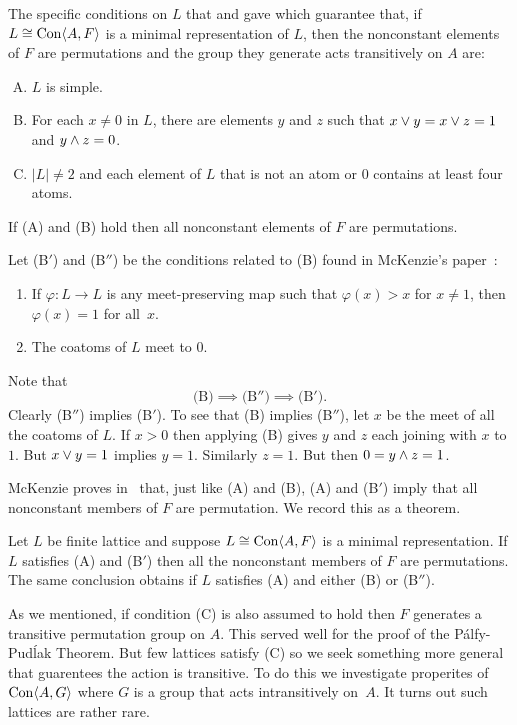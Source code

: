 The specific conditions on $L$ that 
\Palfy and \Pudlak gave which guarantee 
that, if $L \cong \operatorname{Con} \langle A,F\rangle$ is a minimal representation of $L$,
then the nonconstant elements of $F$ are 
permutations and the group they generate acts transitively on $A$ are:
\begin{enumerate}[(A)]
\item $L$ is simple.
\item For each $x \ne 0$ in $L$, there are elements $y$ and $z$
such that $x \vee y = x \vee z = 1$ and $y\wedge z = 0$.
\item $|L|\ne 2$ and each element of $L$ that is not an atom or $0$ contains at
least four atoms.
\end{enumerate}
If (A) and (B) hold then all nonconstant elements of $F$ are permutations.

Let (B$'$) and (B$''$) be the conditions related to (B) found in McKenzie's
paper~\cite{McKenzie1983}:
\begin{enumerate}
\item[(B$'$)]
If $\varphi: L \to L$ is any meet-preserving map such that $\varphi(x) > x$ for
$x\ne 1$, then $\varphi(x) = 1$ for all~$x$.
\item[(B$''$)]
The coatoms of $L$ meet to $0$.
\end{enumerate}
Note that
\[
\text{(B)} \implies \text{(B$''$)}  \implies \text{(B$'$)}.
\]
Clearly (B$''$) implies (B$'$). To see that (B) implies (B$''$),
let $x$ be the meet of all the coatoms of $L$. If $x > 0$
then applying (B) gives $y$ and $z$ each joining with $x$ to $1$.
But $x\vee y = 1$ implies $y = 1$. Similarly $z = 1$. But then
$0 = y \wedge z = 1$.


McKenzie proves in~\cite{McKenzie1983} that, just like (A) and (B),
(A) and (B$'$) imply that all nonconstant members of $F$ are
permutation. We record this as a theorem.

\begin{theorem}
Let $L$ be finite lattice and suppose $L \cong \operatorname{Con} \langle A,F\rangle$
is a minimal representation. If $L$ satisfies \textup{(A)} and
\textup{(B$'$)} then
all the nonconstant members of $F$ are permutations. 
The same conclusion obtains if 
$L$ satisfies \textup{(A)} and either \textup{(B)} or
\textup{(B$''$)}.
\end{theorem}

As we mentioned, if condition (C) is also assumed to hold then
$F$ generates a transitive permutation group on $A$. 
This served well for the proof of the P\'alfy-Pud\'lak Theorem. 
But few lattices satisfy (C) so we seek something more general
that guarentees the action is transitive. To do this we investigate 
properites of $\operatorname{Con} \langle A,G\rangle$ where $G$ is a group that acts
intransitively on~$A$. It turns out such lattices are rather rare.


